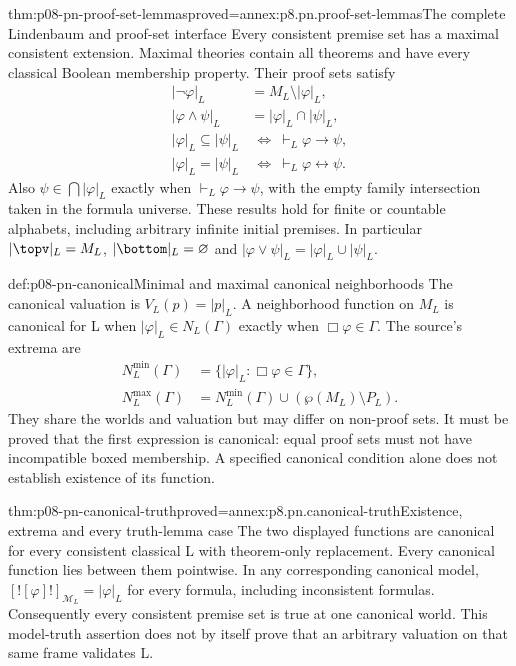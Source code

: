 \begin{hblemma}{thm:p08-pn-proof-set-lemmas}{proved=annex:p8.pn.proof-set-lemmas}{The complete Lindenbaum and proof-set interface}
Every consistent premise set has a maximal consistent extension.
Maximal theories contain all theorems and have every classical Boolean
membership property. Their proof sets satisfy
\[
\begin{aligned}
 |\neg\varphi|_L&=M_L\setminus|\varphi|_L,\\
 |\varphi\land\psi|_L&=|\varphi|_L\cap|\psi|_L,\\
 |\varphi|_L\subseteq|\psi|_L
   &\ \Longleftrightarrow\ \vdash_L\varphi\to\psi,\\
 |\varphi|_L=|\psi|_L
   &\ \Longleftrightarrow\ \vdash_L\varphi\leftrightarrow\psi.
\end{aligned}
\]
Also \(\psi\in\bigcap|\varphi|_L\) exactly when
\(\vdash_L\varphi\to\psi\), with the empty family intersection
taken in the formula universe. These results hold for finite or
countable alphabets, including arbitrary infinite initial premises.
In particular \(|\topv|_L=M_L\), \(|\bottom|_L=\varnothing\)
and \(|\varphi\lor\psi|_L=|\varphi|_L\cup|\psi|_L\).
\end{hblemma}

\begin{hbdefinition}{def:p08-pn-canonical}{Minimal and maximal canonical neighborhoods}
The canonical valuation is \(V_L(p)=|p|_L\). A neighborhood
function on \(M_L\) is canonical for L when
\(|\varphi|_L\in N_L(\Gamma)\) exactly when
\(\Box\varphi\in\Gamma\). The source's extrema are
\[
\begin{aligned}
 N_L^{\min}(\Gamma)&=\{|\varphi|_L:\Box\varphi\in\Gamma\},\\
 N_L^{\max}(\Gamma)&=N_L^{\min}(\Gamma)
                 \cup(\wp(M_L)\setminus P_L).
\end{aligned}
\]
They share the worlds and valuation but may differ on non-proof sets.
It must be proved that the first expression is canonical: equal proof
sets must not have incompatible boxed membership. A specified canonical
condition alone does not establish existence of its function.
\end{hbdefinition}

\begin{hbtheorem}{thm:p08-pn-canonical-truth}{proved=annex:p8.pn.canonical-truth}{Existence, extrema and every truth-lemma case}
The two displayed functions are canonical for every consistent
classical L with theorem-only replacement. Every canonical function
lies between them pointwise. In any corresponding canonical model,
\([![\varphi]!]_{\mathcal M_L}=|\varphi|_L\) for every
formula, including inconsistent formulas. Consequently every consistent
premise set is true at one canonical world. This model-truth assertion
does not by itself prove that an arbitrary valuation on that same
frame validates L.
\end{hbtheorem}

